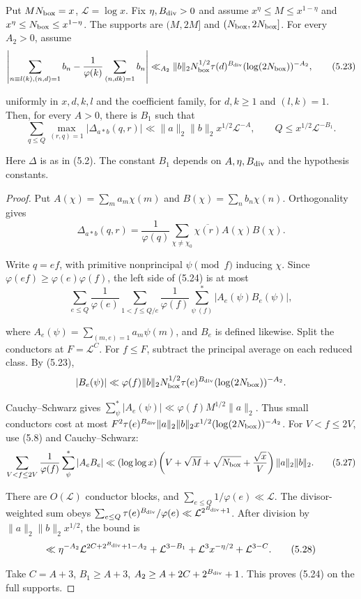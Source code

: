 \begin{lemma}
\label{lem:complete-support-bv}
Put $MN_{\rm box}=x$, $\mathcal L=\log x$.
Fix $\eta,B_{\rm div}>0$ and assume
$x^\eta\le M\le x^{1-\eta}$ and
$x^\eta\le N_{\rm box}\le x^{1-\eta}$.
The supports are $(M,2M]$ and $(N_{\rm box},2N_{\rm box}]$.
For every $A_2>0$, assume
\[
 \left|\sum_{n\equiv l(k),(n,d)=1}b_n
 -\frac1{\varphi(k)}\sum_{(n,dk)=1}b_n\right|
 \ll_{A_2}\|b\|_2N_{\rm box}^{1/2}\tau(d)^{B_{\rm div}}
       (\log(2N_{\rm box}))^{-A_2},
\tag{5.23}
\]

uniformly in $x,d,k,l$ and the coefficient family,
for $d,k\ge1$ and $(l,k)=1$.
Then, for every $A>0$, there is $B_1$ such that
\[
 \sum_{q\le Q}\max_{(r,q)=1}|\Delta_{a*b}(q,r)|
 \ll\|a\|_2\|b\|_2x^{1/2}\mathcal L^{-A},\qquad
 Q\le x^{1/2}\mathcal L^{-B_1}.
\tag{5.24}
\]

Here $\Delta$ is as in (5.2).
The constant $B_1$ depends on $A,\eta,B_{\rm div}$
and the hypothesis constants.
\end{lemma}

\begin{proof}
Put $A(\chi)=\sum_m a_m\chi(m)$ and
$B(\chi)=\sum_n b_n\chi(n)$.
Orthogonality gives
\[
 \Delta_{a*b}(q,r)=\frac1{\varphi(q)}
 \sum_{\chi\ne\chi_0}\overline{\chi(r)}A(\chi)B(\chi).
\tag{5.25}
\]

Write $q=ef$, with primitive nonprincipal $\psi\pmod f$ inducing $\chi$.
Since $\varphi(ef)\ge\varphi(e)\varphi(f)$, the left side of (5.24) is at most
\[
 \sum_{e\le Q}\frac1{\varphi(e)}
 \sum_{1<f\le Q/e}\frac1{\varphi(f)}
 \sum_{\psi\ (f)}^*|A_e(\psi)B_e(\psi)|,
\tag{5.26}
\]

where $A_e(\psi)=\sum_{(m,e)=1}a_m\psi(m)$,
and $B_e$ is defined likewise.
Split the conductors at $F=\mathcal L^C$.
For $f\le F$, subtract the principal average on each reduced class.
By (5.23),
\[
 |B_e(\psi)|\ll\varphi(f)\|b\|_2N_{\rm box}^{1/2}
 \tau(e)^{B_{\rm div}}(\log(2N_{\rm box}))^{-A_2}.
\]

Cauchy--Schwarz gives
$\sum_\psi^*|A_e(\psi)|\ll\varphi(f)M^{1/2}\|a\|_2$.
Thus small conductors cost at most
$F^2\tau(e)^{B_{\rm div}}\|a\|_2\|b\|_2x^{1/2}(\log(2N_{\rm box}))^{-A_2}$.
For $V<f\le2V$, use (5.8) and Cauchy--Schwarz:
\begingroup\small
\[
 \sum_{V<f\le2V}\frac1{\varphi(f)}\sum_\psi^*|A_eB_e|
 \ll (\log\log x)
 \left(V+\sqrt M+\sqrt{N_{\rm box}}+\frac{\sqrt x}{V}\right)\|a\|_2\|b\|_2.
\tag{5.27}
\]

\endgroup
There are $O(\mathcal L)$ conductor blocks,
and $\sum_{e\le Q}1/\varphi(e)\ll\mathcal L$.
The divisor-weighted sum obeys
$\sum_{e\le Q}\tau(e)^{B_{\rm div}}/\varphi(e)\allowbreak
\ll\mathcal L^{2^{B_{\rm div}}+1}$.
After division by $\|a\|_2\|b\|_2x^{1/2}$, the bound is
\begingroup\small
\[
 \ll \eta^{-A_2}\mathcal L^{2C+2^{B_{\rm div}}+1-A_2}
 +\mathcal L^{3-B_1}+\mathcal L^3x^{-\eta/2}+\mathcal L^{3-C}.
\tag{5.28}
\]

\endgroup
Take $C=A+3$, $B_1\ge A+3$,
$A_2\ge A+2C+2^{B_{\rm div}}+1$.
This proves (5.24) on the full supports.
\end{proof}

